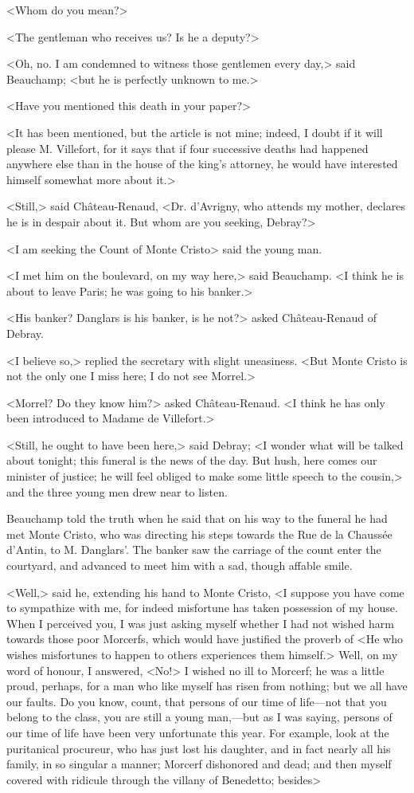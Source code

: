  <Whom do you mean?> 

 <The gentleman who receives us? Is he a deputy?> 

 <Oh, no. I am condemned to witness those gentlemen every day,> said Beauchamp; <but he is perfectly unknown to me.> 

 <Have you mentioned this death in your paper?> 

 <It has been mentioned, but the article is not mine; indeed, I doubt if it will please M. Villefort, for it says that if four successive deaths had happened anywhere else than in the house of the king's attorney, he would have interested himself somewhat more about it.> 

 <Still,> said Château-Renaud, <Dr. d'Avrigny, who attends my mother, declares he is in despair about it. But whom are you seeking, Debray?> 

 <I am seeking the Count of Monte Cristo> said the young man. 

 <I met him on the boulevard, on my way here,> said Beauchamp. <I think he is about to leave Paris; he was going to his banker.> 

 <His banker? Danglars is his banker, is he not?> asked Château-Renaud of Debray. 

 <I believe so,> replied the secretary with slight uneasiness. <But Monte Cristo is not the only one I miss here; I do not see Morrel.> 

 <Morrel? Do they know him?> asked Château-Renaud. <I think he has only been introduced to Madame de Villefort.> 

 <Still, he ought to have been here,> said Debray; <I wonder what will be talked about tonight; this funeral is the news of the day. But hush, here comes our minister of justice; he will feel obliged to make some little speech to the cousin,> and the three young men drew near to listen. 

 Beauchamp told the truth when he said that on his way to the funeral he had met Monte Cristo, who was directing his steps towards the Rue de la Chaussée d'Antin, to M. Danglars'. The banker saw the carriage of the count enter the courtyard, and advanced to meet him with a sad, though affable smile. 

 <Well,> said he, extending his hand to Monte Cristo, <I suppose you have come to sympathize with me, for indeed misfortune has taken possession of my house. When I perceived you, I was just asking myself whether I had not wished harm towards those poor Morcerfs, which would have justified the proverb of <He who wishes misfortunes to happen to others experiences them himself.> Well, on my word of honour, I answered, <No!> I wished no ill to Morcerf; he was a little proud, perhaps, for a man who like myself has risen from nothing; but we all have our faults. Do you know, count, that persons of our time of life—not that you belong to the class, you are still a young man,—but as I was saying, persons of our time of life have been very unfortunate this year. For example, look at the puritanical procureur, who has just lost his daughter, and in fact nearly all his family, in so singular a manner; Morcerf dishonored and dead; and then myself covered with ridicule through the villany of Benedetto; besides\longdash> 

